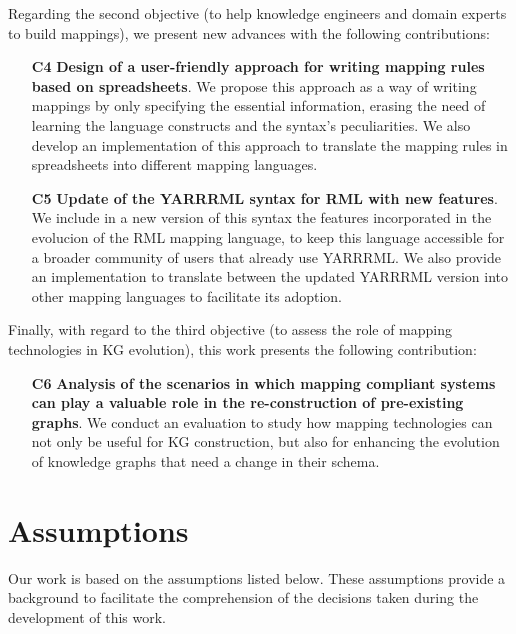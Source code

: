 Regarding the second objective (to help knowledge engineers and domain experts to build mappings), we present new advances with the following contributions:

\begin{enumerate}
    \item[\textbf{C4}] \textbf{Design of a user-friendly approach for writing mapping rules based on spreadsheets}. We propose this approach as a way of writing mappings by only specifying the essential information, erasing the need of learning the language constructs and the syntax's peculiarities. We also develop an implementation of this approach to translate the mapping rules in spreadsheets into different mapping languages. 
    \item[\textbf{C5}] \textbf{Update of the YARRRML syntax for RML with new features}. We include in a new version of this syntax the features incorporated in the evolucion of the RML mapping language, to keep this language accessible for a broader community of users that already use YARRRML. We also provide an implementation to translate between the updated YARRRML version into other mapping languages to facilitate its adoption.
\end{enumerate}

Finally, with regard to the third objective (to assess the role of mapping technologies in KG evolution), this work presents the following contribution:

\begin{enumerate}
    \item[\textbf{C6}]\textbf{ Analysis of the scenarios in which mapping compliant systems can play a valuable role in the re-construction of pre-existing graphs}. We conduct an evaluation to study how mapping technologies can not only be useful for KG construction, but also for enhancing the evolution of knowledge graphs that need a change in their schema. 
\end{enumerate}


\section{Assumptions}
\label{sec:chp3-assumptions}
Our work is based on the assumptions listed below. These assumptions provide a background to facilitate the comprehension of the decisions taken during the development of this work. 


